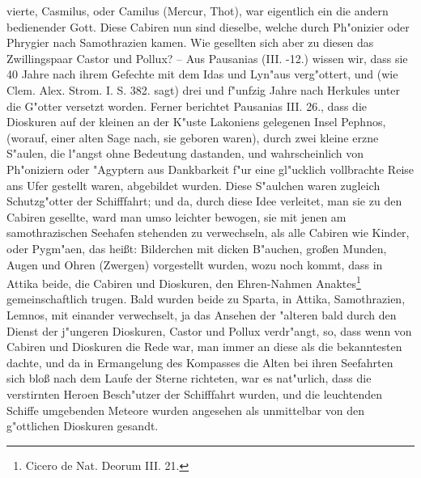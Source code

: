 \documentclass[a4paper, 11pt, oneside, polutonikogreek, german]{article}
\begin{document}
vierte, Casmilus, oder Camilus (Mercur, Thot), war eigentlich ein die andern bedienender Gott. Diese Cabiren nun sind dieselbe, welche durch Ph"onizier oder Phrygier nach Samothrazien kamen. Wie gesellten sich aber zu diesen das Zwillingspaar Castor und Pollux? -- Aus Pausanias (III. -12.) wissen wir, dass sie 40 Jahre nach ihrem Gefechte mit dem Idas und Lyn"aus verg"ottert, und (wie Clem. Alex. Strom. I. S. 382. sagt) drei und f"unfzig Jahre nach Herkules unter die G"otter versetzt worden. Ferner berichtet Pausanias III. 26., dass die Dioskuren auf der kleinen an der K"uste Lakoniens gelegenen Insel Pephnos, (worauf, einer alten Sage nach, sie geboren waren), durch zwei kleine erzne S"aulen, die l"angst ohne Bedeutung dastanden, und wahrscheinlich von Ph"oniziern oder "Agyptern aus Dankbarkeit f"ur eine gl"ucklich vollbrachte Reise ans Ufer gestellt waren, abgebildet wurden. Diese S"aulchen waren zugleich Schutzg"otter der Schifffahrt; und da, durch diese Idee verleitet, man sie zu den Cabiren gesellte, ward man umso leichter bewogen, sie mit jenen am samothrazischen Seehafen stehenden zu verwechseln, als alle Cabiren wie Kinder, oder Pygm"aen, das heißt: Bilderchen mit dicken B"auchen, großen Munden, Augen und Ohren (Zwergen) vorgestellt wurden, wozu noch kommt, dass in Attika beide, die Cabiren und Dioskuren, den Ehren-Nahmen Anaktes\footnote{Cicero de Nat. Deorum III. 21.} gemeinschaftlich trugen. Bald wurden beide zu Sparta, in Attika, Samothrazien, Lemnos, mit einander verwechselt, ja das Ansehen der "alteren bald durch den Dienst der j"ungeren Dioskuren, Castor und Pollux verdr"angt, so, dass wenn von Cabiren und Dioskuren die Rede war, man immer an diese als die bekanntesten dachte, und da in Ermangelung des Kompasses die Alten bei ihren Seefahrten sich bloß nach dem Laufe der Sterne richteten, war es nat"urlich, dass die verstirnten Heroen Besch"utzer der Schifffahrt wurden, und die leuchtenden Schiffe umgebenden Meteore wurden angesehen als unmittelbar von den g"ottlichen Dioskuren gesandt.
\end{document}
